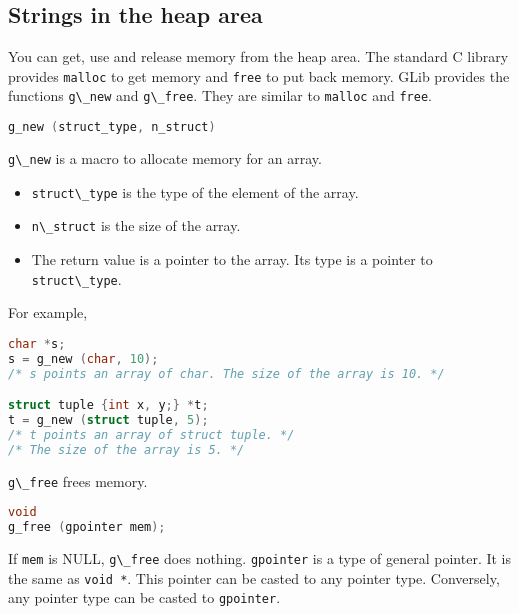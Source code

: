 \subsection{Strings in the heap area}\label{strings-in-the-heap-area}

You can get, use and release memory from the heap area. The standard C
library provides \passthrough{\lstinline!malloc!} to get memory and
\passthrough{\lstinline!free!} to put back memory. GLib provides the
functions \passthrough{\lstinline!g\_new!} and
\passthrough{\lstinline!g\_free!}. They are similar to
\passthrough{\lstinline!malloc!} and \passthrough{\lstinline!free!}.

\begin{lstlisting}[language=C]
g_new (struct_type, n_struct)
\end{lstlisting}

\passthrough{\lstinline!g\_new!} is a macro to allocate memory for an
array.

\begin{itemize}
\tightlist
\item
  \passthrough{\lstinline!struct\_type!} is the type of the element of
  the array.
\item
  \passthrough{\lstinline!n\_struct!} is the size of the array.
\item
  The return value is a pointer to the array. Its type is a pointer to
  \passthrough{\lstinline!struct\_type!}.
\end{itemize}

For example,

\begin{lstlisting}[language=C]
char *s;
s = g_new (char, 10);
/* s points an array of char. The size of the array is 10. */

struct tuple {int x, y;} *t;
t = g_new (struct tuple, 5);
/* t points an array of struct tuple. */
/* The size of the array is 5. */
\end{lstlisting}

\passthrough{\lstinline!g\_free!} frees memory.

\begin{lstlisting}[language=C]
void
g_free (gpointer mem);
\end{lstlisting}

If \passthrough{\lstinline!mem!} is NULL,
\passthrough{\lstinline!g\_free!} does nothing.
\passthrough{\lstinline!gpointer!} is a type of general pointer. It is
the same as \passthrough{\lstinline!void *!}. This pointer can be casted
to any pointer type. Conversely, any pointer type can be casted to
\passthrough{\lstinline!gpointer!}.

